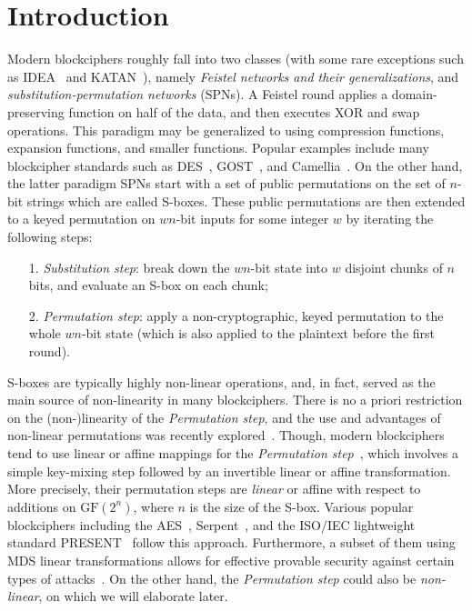
\section{Introduction}
\label{section:Introduction}

Modern blockciphers roughly fall into two classes (with some rare exceptions such as IDEA~\cite{EC:LaiMas90} and KATAN~\cite{CHES:DeCDunKne09}), namely {\it Feistel networks and their generalizations}, and {\it substitution-permutation networks} (SPNs). A Feistel round applies a domain-preserving function on half of the data, and then executes XOR and swap operations. This paradigm may be generalized to using compression functions, expansion functions, and smaller functions. Popular examples include many blockcipher standards such as DES~\cite{DESDesign}, GOST~\cite{GOSTDesign}, and Camellia~\cite{ISOIEC-18033-3:2010}. On the other hand, the latter paradigm SPNs start with a set of public permutations on the set of $n$-bit strings which are called S-boxes. These public permutations are then extended to a keyed permutation on $wn$-bit inputs for some integer $w$ by iterating the following steps:
\begin{enumerate}
	\item[1.] {\it Substitution step}: break down the $wn$-bit state into $w$ disjoint chunks of $n$ bits, and evaluate an S-box on each chunk;
	\item[2.] {\it Permutation step}: apply a non-cryptographic, keyed permutation to the whole $wn$-bit state (which is also applied to the plaintext before the first round).
\end{enumerate}
%
S-boxes are typically highly non-linear operations, and, in fact, served as the main source of non-linearity in many blockciphers. There is no a priori restriction on the (non-)linearity of the {\it Permutation step}, and the use and advantages of non-linear permutations was recently explored~\cite{DBLP:journals/dcc/LiuRL18}. Though, modern blockciphers tend to use linear or affine mappings for the {\it Permutation step}~\cite{DBLP:reference/crypt/Biryukov11aa}, which involves a simple key-mixing step followed
by an invertible linear or affine transformation. More precisely, their permutation steps are {\it linear} or affine with respect to additions on $\text{GF}(2^n)$, where $n$ is the size of the S-box. Various popular blockciphers including the AES~\cite{AESDesign}, Serpent~\cite{serpentProposal}, and the ISO/IEC lightweight standard PRESENT~\cite{CHES:BKLPPR07} follow this approach. Furthermore, a subset of them using MDS linear transformations allows for effective provable security against certain types of attacks~\cite{IMA:DaeRij01,AC:PSCYL02,FSE:PSLL03,miles2015substitution,EC:SLGRL16}. On the other hand, the {\it Permutation step} could also be {\it non-linear}, on which we will elaborate later.


